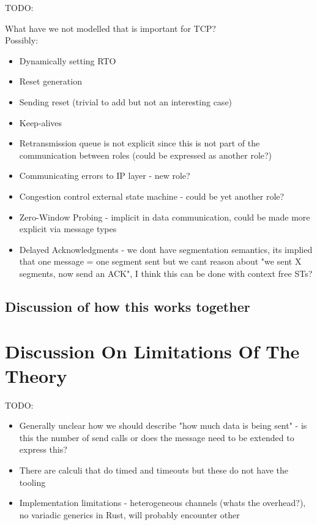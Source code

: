 \documentclass{article}
\newcommand{\todo}[1]{}
\renewcommand{\todo}[1]{{\color{red} TODO: {#1}}}
\begin{document}
\todo{What have we not modelled that is important for TCP? \\
Possibly:\\
\begin{itemize}
    \item Dynamically setting RTO
    \item Reset generation
    \item Sending reset (trivial to add but not an interesting case)
    \item Keep-alives
    \item Retransmission queue is not explicit since this is not part of the communication between roles (could be expressed as another role?)
    \item Communicating errors to IP layer - new role?
    \item Congestion control external state machine - could be yet another role?
    \item Zero-Window Probing - implicit in data communication, could be made more explicit via message types
    \item Delayed Acknowledgments - we dont have segmentation semantics, its implied that one message = one segment sent but we cant reason about "we sent X segments, now send an ACK", I think this can be done with context free STs?
\end{itemize}
}

\subsection{Discussion of how this works together}

\section{Discussion On Limitations Of The Theory}

\todo{
    \begin{itemize}
        \item Generally unclear how we should describe "how much data is being sent" - is this the number of send calls or does the message need to be extended to express this?
        \item There are calculi that do timed and timeouts but these do not have the tooling
        \item Implementation limitations - heterogeneous channels (whats the overhead?), no variadic generics in Rust, will probably encounter other
    \end{itemize}
}
\end{document}
